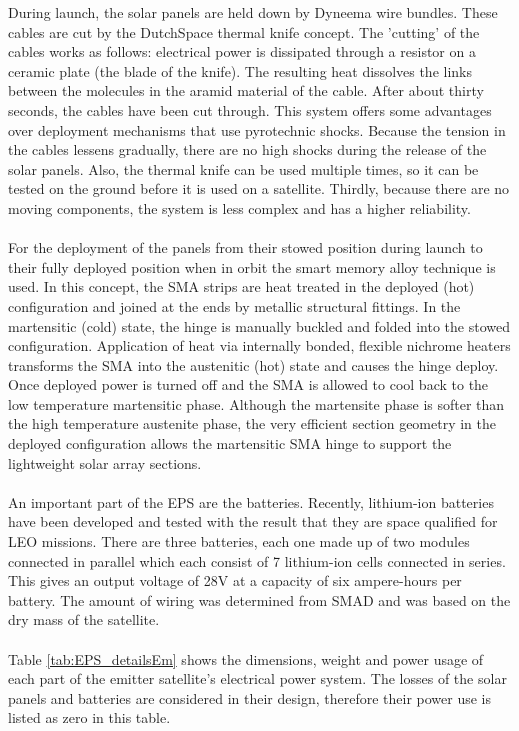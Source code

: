 During launch, the solar panels are held down by Dyneema wire bundles. These cables are cut by the DutchSpace thermal knife concept. The 'cutting' of the cables works as follows: electrical power is dissipated through a resistor on a ceramic plate (the blade of the knife). The resulting heat dissolves the links between the molecules in the aramid material of the cable. After about thirty seconds, the cables have been cut through. This system offers some advantages over deployment mechanisms that use pyrotechnic shocks. Because the tension in the cables lessens gradually, there are no high shocks during the release of the solar panels. Also, the thermal knife can be used multiple times, so it can be tested on the ground before it is used on a satellite. Thirdly, because there are no moving components, the system is less complex and has a higher reliability.
\\\\
For the deployment of the panels from their stowed position during launch to their fully deployed position when in orbit the smart memory alloy technique is used. In this concept, the SMA strips are heat treated in the deployed (hot) configuration and joined at the ends by metallic structural fittings. In the martensitic (cold) state, the hinge is manually buckled and folded into the stowed configuration. Application of heat via internally bonded, flexible nichrome heaters transforms the SMA into the austenitic (hot) state and causes the hinge deploy. Once deployed power is turned off and the SMA is allowed to cool back to the low temperature martensitic phase. Although the martensite phase is softer than the high temperature austenite phase, the very efficient section geometry in the deployed configuration allows the martensitic SMA hinge to support the lightweight solar array sections.
\\ \\
An important part of the EPS are the batteries. Recently, lithium-ion batteries have been developed and tested with the result that they are space qualified for LEO missions. There are three batteries, each one made up of two modules connected in parallel which each consist of 7 lithium-ion cells connected in series. This gives an output voltage of 28V at a capacity of six ampere-hours per battery.
The amount of wiring was determined from SMAD and was based on the dry mass of the satellite.
\\ \\
Table \ref{tab:EPS_detailsEm} shows the dimensions, weight and power usage of each part of the emitter satellite's electrical power system. The losses of the solar panels and batteries are considered in their design, therefore their power use is listed as zero in this table.


